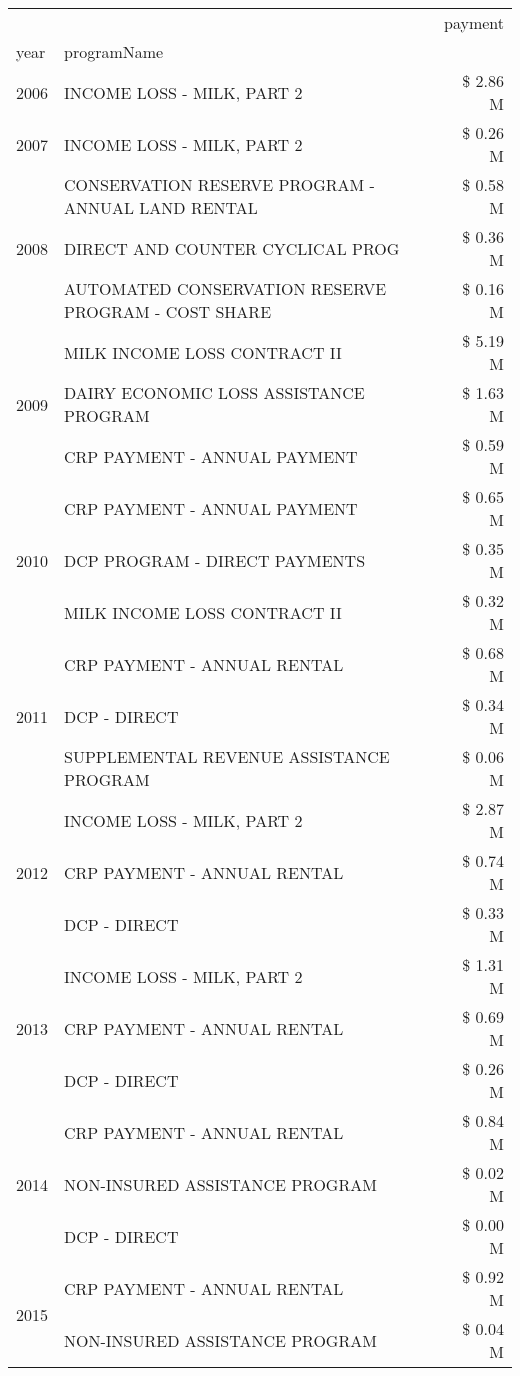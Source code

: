 \begin{tabular}{llr}
\toprule
 &  & payment \\
year & programName &  \\
\midrule
2006 & INCOME LOSS - MILK, PART 2 & \$ 2.86 M \\
\cline{1-3}
2007 & INCOME LOSS - MILK, PART 2 & \$ 0.26 M \\
\cline{1-3}
\multirow[t]{3}{*}{2008} & CONSERVATION RESERVE PROGRAM - ANNUAL LAND RENTAL & \$ 0.58 M \\
 & DIRECT AND COUNTER CYCLICAL PROG & \$ 0.36 M \\
 & AUTOMATED CONSERVATION RESERVE PROGRAM - COST SHARE & \$ 0.16 M \\
\cline{1-3}
\multirow[t]{3}{*}{2009} & MILK INCOME LOSS CONTRACT II & \$ 5.19 M \\
 & DAIRY ECONOMIC LOSS ASSISTANCE PROGRAM & \$ 1.63 M \\
 & CRP PAYMENT - ANNUAL PAYMENT & \$ 0.59 M \\
\cline{1-3}
\multirow[t]{3}{*}{2010} & CRP PAYMENT - ANNUAL PAYMENT & \$ 0.65 M \\
 & DCP PROGRAM - DIRECT PAYMENTS & \$ 0.35 M \\
 & MILK INCOME LOSS CONTRACT II & \$ 0.32 M \\
\cline{1-3}
\multirow[t]{3}{*}{2011} & CRP PAYMENT - ANNUAL RENTAL & \$ 0.68 M \\
 & DCP - DIRECT & \$ 0.34 M \\
 & SUPPLEMENTAL REVENUE ASSISTANCE PROGRAM & \$ 0.06 M \\
\cline{1-3}
\multirow[t]{3}{*}{2012} & INCOME LOSS - MILK, PART 2 & \$ 2.87 M \\
 & CRP PAYMENT - ANNUAL RENTAL & \$ 0.74 M \\
 & DCP - DIRECT & \$ 0.33 M \\
\cline{1-3}
\multirow[t]{3}{*}{2013} & INCOME LOSS - MILK, PART 2 & \$ 1.31 M \\
 & CRP PAYMENT - ANNUAL RENTAL & \$ 0.69 M \\
 & DCP - DIRECT & \$ 0.26 M \\
\cline{1-3}
\multirow[t]{3}{*}{2014} & CRP PAYMENT - ANNUAL RENTAL & \$ 0.84 M \\
 & NON-INSURED ASSISTANCE PROGRAM & \$ 0.02 M \\
 & DCP - DIRECT & \$ 0.00 M \\
\cline{1-3}
\multirow[t]{3}{*}{2015} & CRP PAYMENT - ANNUAL RENTAL & \$ 0.92 M \\
 & NON-INSURED ASSISTANCE PROGRAM & \$ 0.04 M \\

\end{tabular}

